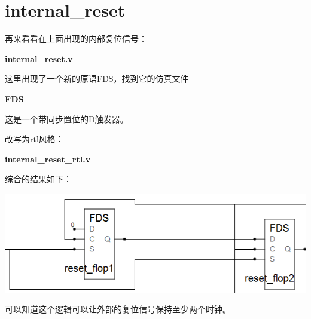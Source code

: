 \section{internal\_reset}

再来看看在上面出现的内部复位信号：

\textbf{internal\_reset.v}


这里出现了一个新的原语FDS，找到它的仿真文件

\textbf{FDS}


这是一个带同步置位的D触发器。

改写为rtl风格：

\textbf{internal\_reset\_rtl.v}


综合的结果如下：

\includegraphics[width=\textwidth]{internal_reset}

可以知道这个逻辑可以让外部的复位信号保持至少两个时钟。

